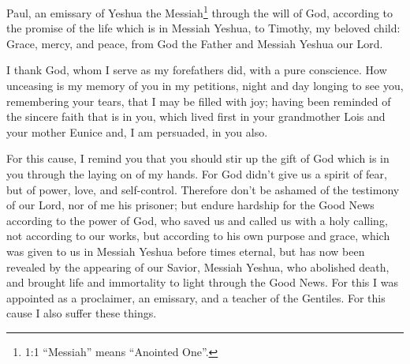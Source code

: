 \newpage
\null
\thispagestyle{empty}
\newpage





\vspace{-1.36in}


\mychapter{} \myverse*{}Paul, an emissary of Yeshua the Messiah\footnote{1:1 “Messiah” means “Anointed One”.} through the will of God, according to the promise of
the life which is in Messiah Yeshua, \myverse{}to Timothy, my beloved child: Grace, mercy, and peace, from God the Father and Messiah Yeshua our Lord.


\myverse{}I thank God, whom I serve as my forefathers did, with a pure conscience. How unceasing is my memory of you in my petitions, night and day \myverse{}longing to see you, remembering your tears, that I may be filled with joy; \myverse{}having been reminded of the sincere faith that is in you, which lived first in your grandmother Lois and your mother Eunice and, I am persuaded, in you also.


\myverse{}For this cause, I remind you that you should stir up the gift of God which is in you through the laying on of my hands. \myverse{}For God didn’t give us a spirit of fear, but of power, love, and self-control. \myverse{}Therefore don’t be ashamed of the testimony of our Lord, nor of me his prisoner; but endure hardship for the Good News according to the power of God, \myverse{}who saved us and called us with a holy calling, not according to our works, but according to his own purpose and grace, which was given to us in Messiah Yeshua before times eternal, \myverse{}but has now been revealed by the appearing of our Savior, Messiah Yeshua, who abolished death, and brought life and immortality to light through the Good News. \myverse{}For this I was appointed as a proclaimer, an emissary, and a teacher of the Gentiles. \myverse{}For this cause I also suffer these things.

